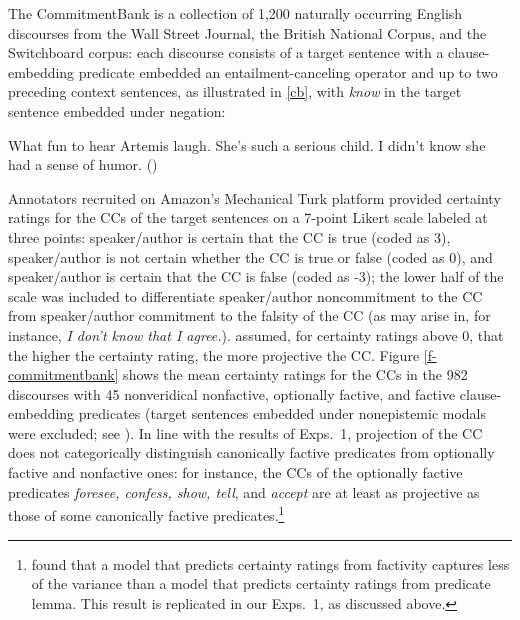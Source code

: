 \documentclass{language}
\newcommand{\6}{\mbox{$[\hspace*{-.6mm}[$}}
\newcommand{\9}{\mbox{$]\hspace*{-.6mm}]$}}
\begin{document}
The CommitmentBank is a collection of 1,200 naturally occurring English discourses from the Wall Street Journal, the British National Corpus, and the Switchboard corpus: each discourse consists of a target sentence with a clause-embedding predicate embedded an entailment-canceling operator and up to two preceding context sentences, as illustrated in \ref{cb}, with {\em know} in the target sentence embedded under negation:

\begin{exe}
\ex\label{cb} What fun to hear Artemis laugh. She's such a serious child. I didn't know she had a sense of humor. \hfill (\citealt[109]{demarneffe-etal-sub23})
\end{exe}
Annotators recruited on Amazon's Mechanical Turk platform provided certainty ratings for the CCs of the target sentences on a 7-point Likert scale labeled at three points: speaker/author is certain that the CC is true (coded as 3), speaker/author is not certain whether the CC is true or false (coded as 0), and speaker/author is certain that the CC is false (coded as -3); the lower half of the scale was included to differentiate speaker/author noncommitment to the CC from speaker/author commitment to the falsity of the CC (as may arise in, for instance, {\em I don't know that I agree.}). \citet{demarneffe-etal-sub23} assumed, for certainty ratings above 0, that the higher the certainty rating, the more projective the CC. Figure \ref{f-commitmentbank} shows the mean certainty ratings for the CCs in the 982 discourses with 45 nonveridical nonfactive, optionally factive, and factive clause-embedding predicates (target sentences embedded under nonepistemic modals were excluded; see \citealt[\S3]{demarneffe-etal-sub23}). In line with the results of Exps.~1, projection of the CC does not categorically distinguish canonically factive predicates from optionally factive and nonfactive ones: for instance, the CCs of the optionally factive predicates {\em foresee, confess, show, tell}, and {\em accept} are at least as projective as those of some canonically factive predicates.\footnote{\citealt{demarneffe-etal-sub23} found that a model that predicts certainty ratings from factivity captures less of the variance than a model that predicts certainty ratings from predicate lemma. This result is replicated in our Exps.~1, as discussed above.}
\end{document}
